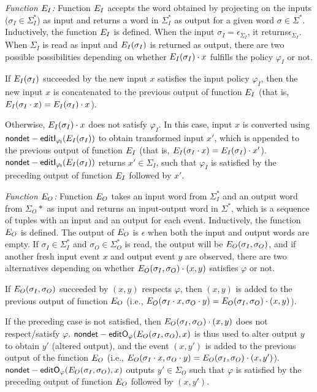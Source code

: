 \textit{Function $E_{I}$:}
Function $E_{I}$ accepts the word obtained by projecting on the inputs ($\sigma_I\in\Sigma_I^*$) as input and returns a word in $\Sigma_I^*$ as output for a given word $\sigma\in\Sigma^*$.
Inductively, the function $E_{I}$ is defined. When the input $\sigma_I = \epsilon_{\Sigma_I}$, it returns$\epsilon_{\Sigma_I}$.
%
When $\Sigma_I$ is read as input and $E_{I}(\sigma_I)$ is returned as output, there are two possible possibilities depending on whether $E_{I}(\sigma_I)\cdot x$ fulfills the policy $\varphi_I$ or not.

\squishlist
\item If $E_{I}(\sigma_I)$ succeeded by the new input $x$ satisfies the input policy $\varphi_I$, then the new input $x$ is concatenated to the previous output of function $E_{I}$ (that is, $E_{I}(\sigma_I \cdot x)=  E_{I}(\sigma_I)\cdot x$).
\item Otherwise, $E_{I}(\sigma_I)\cdot x$ does not satisfy $\varphi_I$.
In this case, input $x$ is converted using $\mathsf{{nondet}-editI_{\varphi_{I}}}(E_{I}(\sigma_I))$ to obtain transformed input $x'$, which is appended to the previous output of function $E_{I}$ (that is, $E_{I}(\sigma_I \cdot x)=  E_{I}(\sigma_I)\cdot x'$).
$\mathsf{{nondet}-editI_{\varphi_{I}}}(E_{I}(\sigma_I))$ returns $x'\in\Sigma_I$, such that $\varphi_I$ is satisfied by the preceding output of function $E_{I}$ followed by $x'$.

\squishend


\textit{Function $E_{O}$:}
Function $E_{O}$ takes an input word from $\Sigma_I^*$ and an output word from $\Sigma_O*$ as input and returns an input-output word in $\Sigma^*$, which is a sequence of tuples with an input and an output for each event.
%
Inductively, the function $E_{O}$ is defined. The output of $E_{O}$ is $\epsilon$ when both the input and output words are empty.
If $\sigma_I\in\Sigma_I^*$ and $\sigma_O \in\Sigma_O^*$ is read, the output will be $E_{O}(\sigma_I,\sigma_O)$, and if another fresh input event $x$ and output event $y$ are observed, there are two alternatives depending on whether $E_{O}(\sigma_I,\sigma_O)\cdot(x,y)$ satisfies $\varphi$ or not.
\squishlist
\item If $E_{O}(\sigma_I,\sigma_O)$ succeeded by $(x,y)$ respects $\varphi$, then  $(x,y)$ is added to the previous output of function $E_{O}$ (i.e., $E_{O}(\sigma_I\cdot x,\sigma_O \cdot y) =  E_{O}(\sigma_I,\sigma_O) \cdot(x,y)$).
\item If the preceding case is not satisfied, then $E_{O}(\sigma_I,\sigma_O) \cdot(x,y)$ does not respect/satisfy $\varphi$. $\mathsf{{nondet}-editO_{\varphi}}(E_{O}(\sigma_I,\sigma_O), x)$ is thus used to alter output $y$ to obtain $y'$ (altered output), and the event $(x,y')$ is added to the previous output of the function $E_{O}$ (i.e., $E_{O}(\sigma_I\cdot x,\sigma_O \cdot y) =  E_{O}(\sigma_I,\sigma_O) \cdot(x,y')$).
$\mathsf{{nondet}-editO_{\varphi}}(E_{O}(\sigma_I,\sigma_O), x)$ outputs $y'\in \Sigma_O$ such that  $\varphi$ is satisfied by the preceding output of function $E_{O}$ followed by $(x,y')$.

